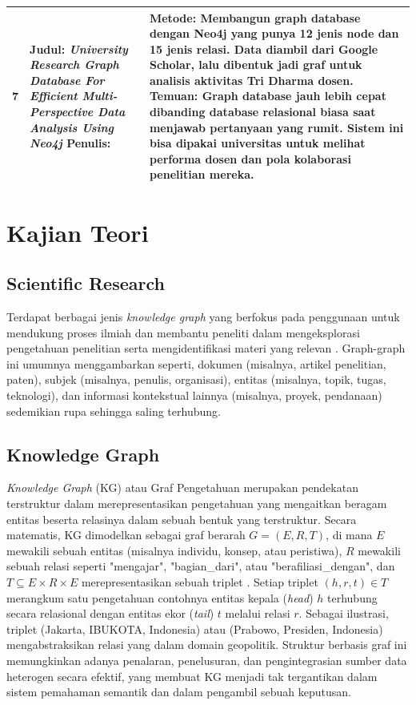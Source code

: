 \begin{longtable}{|p{0.5cm}|p{4cm}|p{5cm}|}
    7 & 
    \textbf{Judul:} \textit{University Research Graph Database For Efficient Multi-Perspective Data Analysis Using Neo4j} \newline
    \textbf{Penulis:} \cite{afandi2020university} &
    \textbf{Metode:} Membangun graph database dengan Neo4j yang punya 12 jenis node dan 15 jenis relasi. Data diambil dari Google Scholar, lalu dibentuk jadi graf untuk analisis aktivitas Tri Dharma dosen. \newline
    \textbf{Temuan:} Graph database jauh lebih cepat dibanding database relasional biasa saat menjawab pertanyaan yang rumit. Sistem ini bisa dipakai universitas untuk melihat performa dosen dan pola kolaborasi penelitian mereka. \\
    \hline
\end{longtable}
		
\section{Kajian Teori}

\subsection{Scientific Research}

Terdapat berbagai jenis \textit{knowledge graph} yang berfokus pada penggunaan untuk mendukung proses ilmiah dan membantu peneliti dalam mengeksplorasi pengetahuan penelitian serta mengidentifikasi materi yang relevan \cite{7458844}. Graph-graph ini umumnya menggambarkan seperti, dokumen (misalnya, artikel penelitian, paten), subjek (misalnya, penulis, organisasi), entitas (misalnya, topik, tugas, teknologi), dan informasi kontekstual lainnya (misalnya, proyek, pendanaan) sedemikian rupa sehingga saling terhubung.

\subsection{Knowledge Graph}

\textit{Knowledge Graph} (KG) atau Graf Pengetahuan merupakan pendekatan terstruktur dalam merepresentasikan pengetahuan yang mengaitkan beragam entitas beserta relasinya dalam sebuah bentuk yang terstruktur. Secara matematis, KG dimodelkan sebagai graf berarah $G = (E, R, T)$, di mana $E$ mewakili sebuah entitas (misalnya individu, konsep, atau peristiwa), $R$ mewakili sebuah relasi seperti "mengajar", "bagian\_dari", atau "berafiliasi\_dengan", dan $T \subseteq E \times R \times E$ merepresentasikan sebuah triplet \cite{Hogan_2021}. Setiap triplet $(h, r, t) \in T$ merangkum satu pengetahuan contohnya entitas kepala (\textit{head}) $h$ terhubung secara relasional dengan entitas ekor (\textit{tail}) $t$ melalui relasi $r$. Sebagai ilustrasi, triplet (Jakarta, IBUKOTA, Indonesia) atau (Prabowo, Presiden, Indonesia) mengabstraksikan relasi yang dalam domain geopolitik. Struktur berbasis graf ini memungkinkan adanya penalaran, penelusuran, dan pengintegrasian sumber data heterogen secara efektif, yang membuat KG menjadi tak tergantikan dalam sistem pemahaman semantik dan dalam pengambil sebuah keputusan.
		

